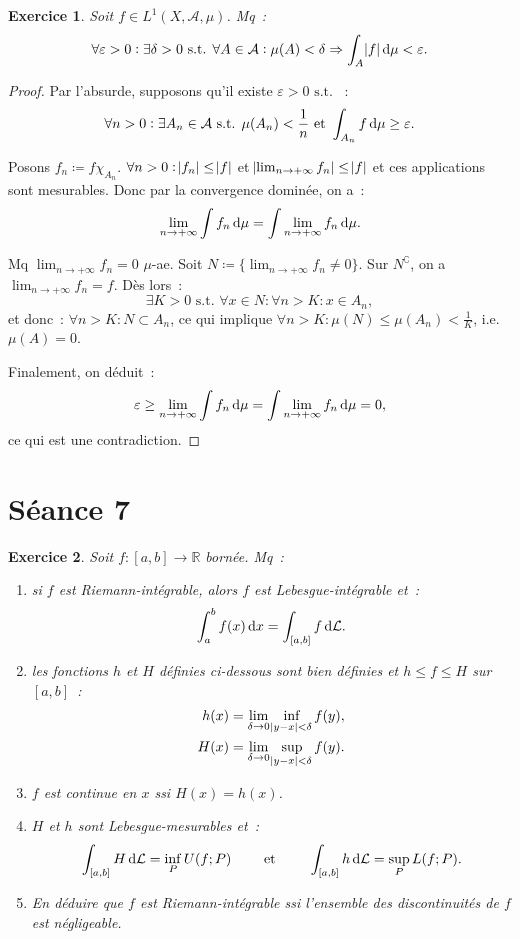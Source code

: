 \documentclass{article}
\newtheorem{ex}{Exercice}[section]
\newcommand{\pinfty}{{+\infty}}
\newcommand{\st}{\text{ s.t. }}
\newcommand{\C}{\complement}
\newcommand{\R}{{\mathbb R}}
\begin{document}
\begin{ex}\label{ex:6.6} Soit $f \in L^1(X, \mathcal A, \mu)$. Mq~:
\[\forall \varepsilon > 0 : \exists \delta > 0 \st \forall A \in \mathcal A : \mu(A) < \delta \Rightarrow \int_A\abs f\dif\mu < \varepsilon.\]
\end{ex}

\begin{proof} Par l'absurde, supposons qu'il existe $\varepsilon > 0 \st$~:
\[\forall n > 0 : \exists A_n \in \mathcal A \st \mu(A_n) < \frac 1n \text{ et } \int_{A_n}f\dif \mu \geq \varepsilon.\]

Posons $f_n \coloneqq f\chi_{A_n}$. $\forall n > 0 : \abs {f_n} \leq \abs f$ et $\abs {\lim_{n \to \pinfty}f_n} \leq \abs f$ et ces applications sont mesurables. Donc par
la convergence dominée, on a~:
\[\lim_{n \to \pinfty}\int f_n\dif\mu = \int\lim_{n \to \pinfty}f_n\dif \mu.\]

Mq $\lim_{n \to \pinfty}f_n = 0$ $\mu$-ae. Soit $N \coloneqq \{\lim_{n \to \pinfty}f_n \neq 0\}$. Sur $N^\C$, on a $\lim_{n \to \pinfty}f_n = f$. Dès lors~:
\[\exists K > 0 \st \forall x \in N : \forall n > K : x \in A_n,\]
et donc~: $\forall n > K : N \subset A_n$, ce qui implique $\forall n > K : \mu(N) \leq \mu(A_n) < \frac 1K$, i.e. $\mu(A) = 0$.

Finalement, on déduit~:
\[\varepsilon \geq \lim_{n \to \pinfty}\int f_n\dif \mu = \int\lim_{n \to \pinfty}f_n\dif \mu = 0,\]
ce qui est une contradiction.
\end{proof}

\newpage
\section{Séance 7}
\begin{ex}\label{ex:7.1}
Soit $f : [a, b] \to \R$ bornée. Mq~:
\begin{enumerate}
	\item si $f$ est Riemann-intégrable, alors $f$ est Lebesgue-intégrable et~:
	\[\int_a^bf(x)\dif x = \int_{[a, b]}f\dif\mathcal L.\]
	\item les fonctions $h$ et $H$ définies ci-dessous sont bien définies et $h \leq f \leq H$ sur $[a, b]$~:
	\begin{align*}
		h(x) &= \lim_{\delta \to 0}\inf_{\abs {y-x}<\delta}f(y), \\
		H(x) &= \lim_{\delta \to 0}\sup_{\abs {y-x}<\delta}f(y).
	\end{align*}
	\item $f$ est continue en $x$ ssi $H(x) = h(x)$.
	\item $H$ et $h$ sont Lebesgue-mesurables et~:
	\[\int_{[a, b]}H\dif\mathcal L = \inf_PU(f; P) \qquad \text{ et } \qquad \int_{[a, b]}h\dif\mathcal L = \sup_PL(f; P).\]
	\item En déduire que $f$ est Riemann-intégrable ssi l'ensemble des discontinuités de $f$ est négligeable.
\end{enumerate}
\end{ex}
\end{document}
